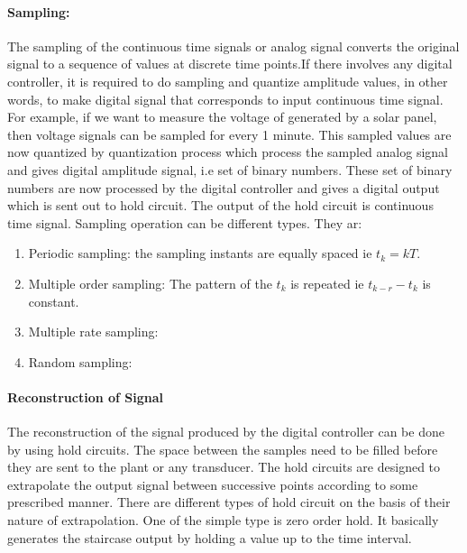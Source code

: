 \documentclass{article}
\begin{document}
\paragraph{Sampling:}
The sampling of the continuous time signals or analog signal converts the original signal to a sequence of values at discrete time points.If there involves any digital controller, it is required to do sampling and quantize amplitude values, in other words, to make digital signal that corresponds to input continuous time signal. For example, if we want to measure the voltage of generated by a solar panel, then voltage signals can be sampled for every 1 minute. This sampled values are now quantized by quantization process which process the sampled analog signal and gives digital amplitude signal, i.e set of binary numbers. These set of binary numbers are now processed by the digital controller and gives a digital output which is sent out to hold circuit. The output of the hold circuit is continuous time signal. Sampling operation can be different types. They ar:
\begin{enumerate}
	\item Periodic sampling: the sampling instants are equally spaced ie $t_k = kT$.
	\item Multiple order sampling: The pattern of the $t_k$ is repeated ie $t_{k-r} - t_k$ is constant.
	\item Multiple rate sampling: 
	\item Random sampling:
\end{enumerate}
\paragraph{Reconstruction of Signal}
The reconstruction of the signal produced by the digital controller can be done by using hold circuits. The space between the samples need to be filled before they are sent to the plant or any transducer. The hold circuits are designed to extrapolate the output signal between successive points according to some prescribed manner.  There are different types of hold circuit on the basis of their nature of extrapolation. One of the simple type is zero order hold. It basically generates the staircase output by holding a value up to the time interval.
\end{document}
